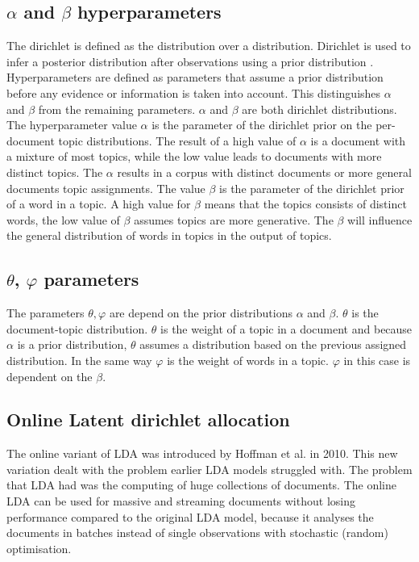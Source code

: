 \subsection{$\alpha$ and $\beta$ hyperparameters}  \label{lda:alphabeta}
The dirichlet is defined as the distribution over a distribution. Dirichlet is used to infer a posterior distribution after observations using a prior distribution \cite{Sethuraman2001APRIORS}. Hyperparameters are defined as parameters that assume a prior distribution before any evidence or information is taken into account. This distinguishes $\alpha$ and $\beta$ from the remaining parameters. $\alpha$ and $\beta$ are both dirichlet distributions. The hyperparameter value $\alpha$ is the parameter of the dirichlet prior on the per-document topic distributions. The result of a high value of $\alpha$ is a document with a mixture of most topics, while the low value leads to documents with more distinct topics. The $\alpha$ results in a corpus with distinct documents or more general documents topic assignments. The value $\beta$ is the parameter of the dirichlet prior of a word in a topic. A high value for $\beta$ means that the topics consists of distinct words, the low value of $\beta$ assumes topics are more generative. The $\beta$ will influence the general distribution of words in topics in the output of topics.

\subsection{$\theta$, $\varphi$ parameters}\label{lda:thetavarphi}
The parameters $\theta, \varphi$ are depend on the prior distributions $\alpha$ and $\beta$. $\theta$ is the document-topic distribution. $\theta$ is the weight of a topic in a document and because $\alpha$ is a prior distribution, $\theta$ assumes a distribution based on the previous assigned distribution. 
In the same way $\varphi$ is the weight of words in a topic. $\varphi$ in this case is dependent on the $\beta$.



\subsection{Online Latent dirichlet allocation} \label{lda:onlinelda}
The online variant of LDA was introduced  by Hoffman et al. in 2010.\cite{Hoffman2010OnlineAllocation} This new variation dealt with the problem earlier LDA models struggled with. The problem that LDA had was the computing of huge collections of documents. The online LDA can be used for massive and streaming documents without losing performance compared to the original LDA model, because it analyses the documents in batches instead of single observations with stochastic (random) optimisation.\cite{Beaver2012StochasticInference} 

